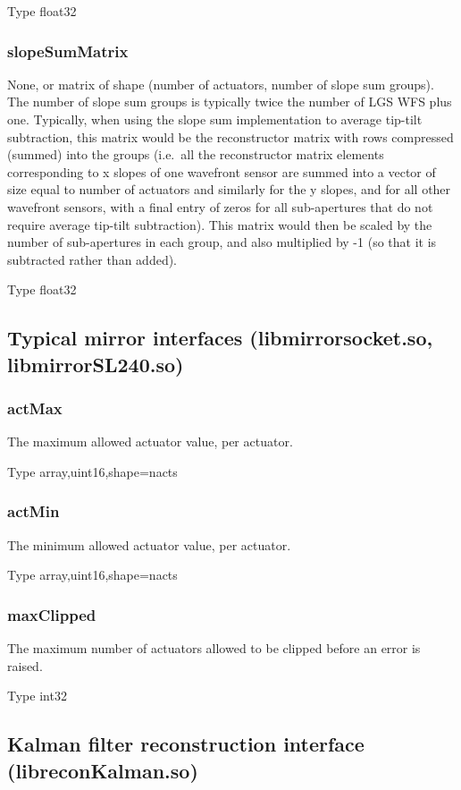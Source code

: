 \documentclass[a4,10pt]{article}
\begin{document}
Type float32

\subsubsection{slopeSumMatrix}
None, or matrix of shape (number of actuators, number of slope sum
groups).  The number of slope sum groups is typically twice the number
of LGS WFS plus one.  Typically, when using the slope sum
implementation to average tip-tilt subtraction, this matrix would be
the reconstructor matrix with rows compressed (summed) into the groups
(i.e.\ all the reconstructor matrix elements corresponding to x slopes
of one wavefront sensor are summed into a vector of size equal to
number of actuators and similarly for the y slopes, and for all other
wavefront sensors, with a final entry of zeros for all sub-apertures
that do not require average tip-tilt subtraction).  This matrix would
then be scaled by the number of sub-apertures in each group, and also
multiplied by -1 (so that it is subtracted rather than added).

Type float32

\subsection{Typical mirror interfaces (libmirrorsocket.so, libmirrorSL240.so)}

\subsubsection{actMax}
The maximum allowed actuator value, per actuator.

Type array,uint16,shape=nacts

\subsubsection{actMin}
The minimum allowed actuator value, per actuator.

Type array,uint16,shape=nacts

\subsubsection{maxClipped}
The maximum number of actuators allowed to be clipped before an error
is raised.

Type int32

\subsection{Kalman filter reconstruction interface (libreconKalman.so)}
\end{document}
